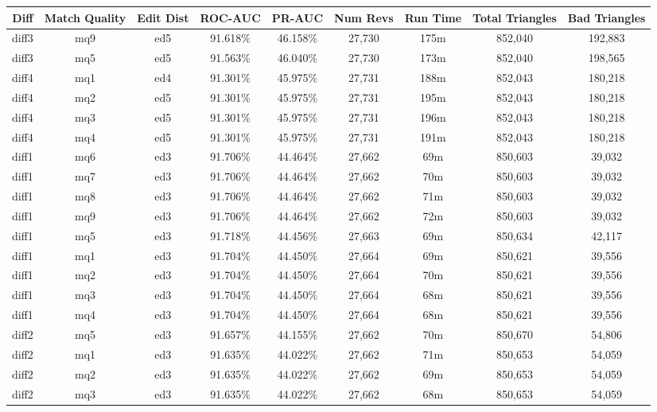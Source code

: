 \begin{sidewaystable}[!tp]
  \begin{center}
    \begin{tabular}{|c|c|c||c|c||c|c|c|c|}
\hline
Diff & Match Quality & Edit Dist
        & ROC-AUC & PR-AUC
        & Num Revs & Run Time
        & Total Triangles & Bad Triangles \\
\hline
\hline
diff3 & mq9 & ed5 & 91.618\% & 46.158\% & 27,730 & 175m & 852,040 & 192,883 \\
diff3 & mq5 & ed5 & 91.563\% & 46.040\% & 27,730 & 173m & 852,040 & 198,565 \\
diff4 & mq1 & ed4 & 91.301\% & 45.975\% & 27,731 & 188m & 852,043 & 180,218 \\
diff4 & mq2 & ed5 & 91.301\% & 45.975\% & 27,731 & 195m & 852,043 & 180,218 \\
diff4 & mq3 & ed5 & 91.301\% & 45.975\% & 27,731 & 196m & 852,043 & 180,218 \\
diff4 & mq4 & ed5 & 91.301\% & 45.975\% & 27,731 & 191m & 852,043 & 180,218 \\
diff1 & mq6 & ed3 & 91.706\% & 44.464\% & 27,662 & 69m & 850,603 & 39,032 \\
diff1 & mq7 & ed3 & 91.706\% & 44.464\% & 27,662 & 70m & 850,603 & 39,032 \\
diff1 & mq8 & ed3 & 91.706\% & 44.464\% & 27,662 & 71m & 850,603 & 39,032 \\
diff1 & mq9 & ed3 & 91.706\% & 44.464\% & 27,662 & 72m & 850,603 & 39,032 \\
diff1 & mq5 & ed3 & 91.718\% & 44.456\% & 27,663 & 69m & 850,634 & 42,117 \\
diff1 & mq1 & ed3 & 91.704\% & 44.450\% & 27,664 & 69m & 850,621 & 39,556 \\
diff1 & mq2 & ed3 & 91.704\% & 44.450\% & 27,664 & 70m & 850,621 & 39,556 \\
diff1 & mq3 & ed3 & 91.704\% & 44.450\% & 27,664 & 68m & 850,621 & 39,556 \\
diff1 & mq4 & ed3 & 91.704\% & 44.450\% & 27,664 & 68m & 850,621 & 39,556 \\
diff2 & mq5 & ed3 & 91.657\% & 44.155\% & 27,662 & 70m & 850,670 & 54,806 \\
diff2 & mq1 & ed3 & 91.635\% & 44.022\% & 27,662 & 71m & 850,653 & 54,059 \\
diff2 & mq2 & ed3 & 91.635\% & 44.022\% & 27,662 & 69m & 850,653 & 54,059 \\
diff2 & mq3 & ed3 & 91.635\% & 44.022\% & 27,662 & 68m & 850,653 & 54,059 \\

\end{tabular}
\end{center}
\end{sidewaystable}
